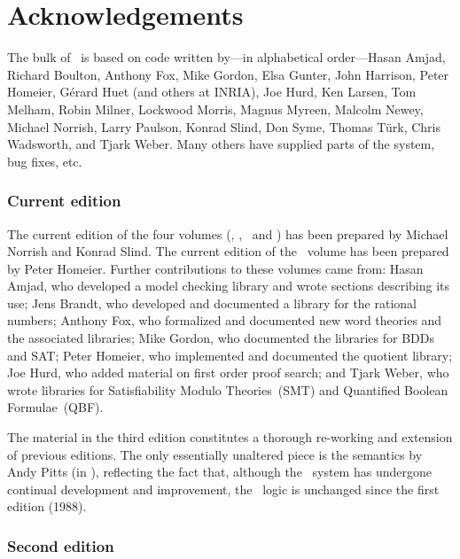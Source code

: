 \chapter*{Acknowledgements}

The bulk of \HOL\ is based on code written by---in alphabetical
order---Hasan Amjad, Richard Boulton, Anthony Fox, Mike Gordon, Elsa
Gunter, John Harrison, Peter Homeier, G\'erard Huet (and others at
INRIA), Joe Hurd, Ken Larsen, Tom Melham, Robin Milner, Lockwood
Morris, Magnus Myreen, Malcolm Newey, Michael Norrish, Larry Paulson,
Konrad Slind, Don Syme, Thomas T\"urk, Chris Wadsworth, and Tjark
Weber.  Many others have supplied parts of the system, bug fixes, etc.

\subsection*{Current edition}

The current edition of the four volumes (\LOGIC, \TUTORIAL,
\DESCRIPTION\ and \REFERENCE) has been prepared by Michael Norrish and
Konrad Slind.
The current edition of the \HOLOMEGA\ volume has been prepared
by Peter Homeier.
Further contributions to these volumes came from: Hasan
Amjad, who developed a model checking library and wrote sections
describing its use; Jens Brandt, who developed and documented a
library for the rational numbers; Anthony Fox, who formalized and
documented new word theories and the associated libraries; Mike
Gordon, who documented the libraries for BDDs and SAT; Peter Homeier,
who implemented and documented the quotient library; Joe Hurd, who
added material on first order proof search; and Tjark Weber, who wrote
libraries for Satisfiability Modulo Theories~(SMT) and Quantified
Boolean Formulae~(QBF).

\medskip

The material in the third edition constitutes a thorough re-working
and extension of previous editions.  The only essentially unaltered
piece is the semantics by Andy Pitts (in \LOGIC), reflecting the fact
that, although the \HOL\ system has undergone continual development
and improvement, the \HOL\ logic is unchanged since the first edition
(1988).

\newpage

\subsection*{Second edition}


